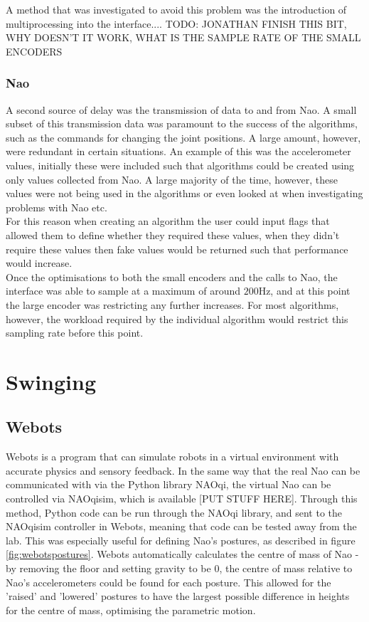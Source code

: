 \documentclass[11pt]{article}
\newcommand*\ruleline[1]{\par\noindent\raisebox{.8ex}{\makebox[\linewidth]{\hrulefill\hspace{1ex}\raisebox{-.8ex}{#1}\hspace{1ex}\hrulefill}}}
\begin{document}
A method that was investigated to avoid this problem was the introduction of multiprocessing into the interface....
TODO: JONATHAN FINISH THIS BIT, WHY DOESN'T IT WORK, WHAT IS THE SAMPLE RATE OF THE SMALL ENCODERS

\subsubsection{Nao}
\ruleline{George Sheppard}
A second source of delay was the transmission of data to and from Nao. A small subset of this transmission data was paramount to the success of the algorithms, such as the commands for changing the joint positions. A large amount, however, were redundant in certain situations. An example of this was the accelerometer values, initially these were included such that algorithms could be created using only values collected from Nao. A large majority of the time, however, these values were not being used in the algorithms or even looked at when investigating problems with Nao etc.\\

For this reason when creating an algorithm the user could input flags that allowed them to define whether they required these values, when they didn't require these values then fake values would be returned such that performance would increase.\\

Once the optimisations to both the small encoders and the calls to Nao, the interface was able to sample at a maximum of around $200$Hz, and at this point the large encoder was restricting any further increases. For most algorithms, however, the workload required by the individual algorithm would restrict this sampling rate before this point. 

\section{Swinging}

\subsection{Webots}
\ruleline{James Doering}
Webots is a program that can simulate robots in a virtual environment with accurate physics and sensory feedback. In the same way that the real Nao can be communicated with via the Python library NAOqi, the virtual Nao can be controlled via NAOqisim, which is available [PUT STUFF HERE]. Through this method, Python code can be run through the NAOqi library, and sent to the NAOqisim controller in Webots, meaning that code can be tested away from the lab. This was especially useful for defining Nao's postures, as described in figure \ref{fig:webotspostures}. Webots automatically calculates the centre of mass of Nao - by removing the floor and setting gravity to be 0, the centre of mass relative to Nao's accelerometers could be found for each posture. This allowed for the 'raised' and 'lowered' postures to have the largest possible difference in heights for the centre of mass, optimising the parametric motion.\\
\end{document}
